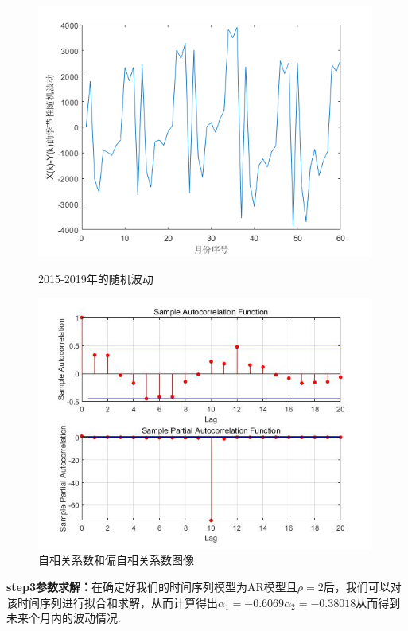 \documentclass{whutmod}
\begin{document}
	\begin{figure}[!h]
		\centering
		\begin{minipage}[c]{0.48\textwidth}
			\centering
			\includegraphics[width=0.99\textwidth]{timeorigin.png}
			\caption{2015-2019年的随机波动}
		\end{minipage}
		\begin{minipage}[c]{0.48\textwidth}
			\centering
			\includegraphics[width=0.99\textwidth]{rhocomfirm.jpg}
			\caption{自相关系数和偏自相关系数图像}
		\end{minipage}
	\end{figure}
	\textbf{step3参数求解：}在确定好我们的时间序列模型为AR模型且$\rho=2$后，我们可以对该时间序列进行拟合和求解，从而计算得出$\alpha_1=-0.6069 \alpha_2=-0.38018 $从而得到未来个月内的波动情况.
\end{document}
